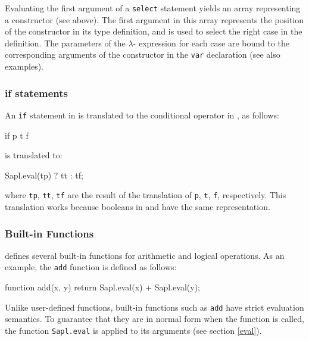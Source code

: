 Evaluating the first argument of a \texttt{select} statement yields an array representing a constructor (see above). The first argument in this array 
represents the position of the constructor in its type definition, and is used 
to select the right case in the definition. The parameters of the $\lambda$-
expression for each case are bound to the corresponding arguments of the constructor in the \texttt{var} declaration (see also examples).

\subsubsection{\textsf{if} statements} 
An \texttt{if} statement in \Sapl is translated to the conditional operator in 
\JS, as follows:
\begin{CleanCode}
if p t f
\end{CleanCode}
is translated to:
\begin{CleanCode}
Sapl.eval(tp) ? tt : tf;
\end{CleanCode}
where \texttt{tp}, \texttt{tt}, \texttt{tf} are the result of the translation of
\texttt{p}, \texttt{t}, \texttt{f}, respectively. This translation works because
booleans in \Sapl and \JS have the same representation.

\subsubsection{Built-in Functions}
\Sapl defines several built-in functions for arithmetic and logical operations.
As an example, the \texttt{add} function is defined as follows:
\begin{CleanCode}
function add(x, y) { return Sapl.eval(x) + Sapl.eval(y); }
\end{CleanCode}
Unlike user-defined functions, built-in functions such as \texttt{add} have
strict evaluation semantics. To guarantee that they are in normal form when the 
function is called, the function \texttt{Sapl.eval} is applied to its arguments
(see section \ref{eval}).

